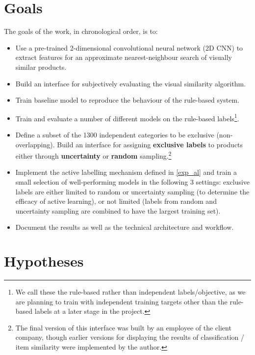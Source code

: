 \section{Goals}

The goals of the work, in chronological order, is to:

\begin{itemize}
  \item Use a pre-trained 2-dimensional convolutional neural network (2D CNN) to extract features for an approximate nearest-neighbour search of visually similar products.
  \item Build an interface for subjectively evaluating the visual similarity algorithm.
  \item Train  baseline model to reproduce the behaviour of the rule-based system.
  \item Train and evaluate a number of different models on the rule-based labels\footnote{We call these the rule-based rather than independent labels/objective, as we are planning to train with independent training targets other than the rule-based labels at a later stage in the project.}.
  \item
    Define a subset of the 1300 independent categories to be exclusive (non-overlapping).
    Build an interface for assigning \textbf{exclusive labels} to products either through \textbf{uncertainty} or \textbf{random} sampling.\footnote{The final version of this interface was built by an employee of the client company, though earlier versions for displaying the results of classification / item similarity were implemented by the author.}
  \item Implement the active labelling mechanism defined in \ref{exp_al} and train a small selection of well-performing models in the following 3 settings: exclusive labels are either limited to random or uncertainty sampling (to determine the efficacy of active learning), or not limited (labels from random and uncertainty sampling are combined to have the largest training set).
  \item Document the results as well as the technical architecture and workflow.
\end{itemize}

\section{Hypotheses}

